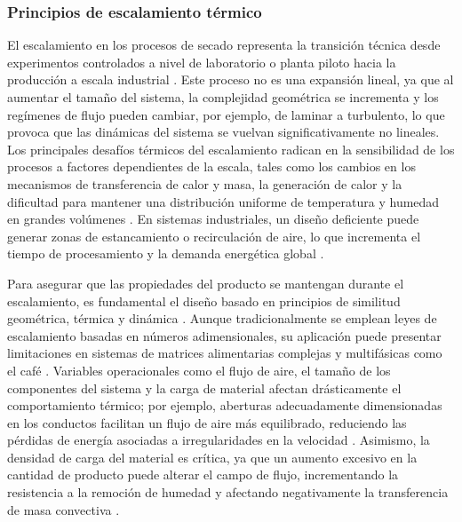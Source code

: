\subsubsection{Principios de escalamiento térmico}

El escalamiento en los procesos de secado representa la transición técnica desde experimentos controlados a nivel de laboratorio o planta piloto hacia la producción a escala industrial \parencite{szpicer_advances_2025}. Este proceso no es una expansión lineal, ya que al aumentar el tamaño del sistema, la complejidad geométrica se incrementa y los regímenes de flujo pueden cambiar, por ejemplo, de laminar a turbulento, lo que provoca que las dinámicas del sistema se vuelvan significativamente no lineales. Los principales desafíos térmicos del escalamiento radican en la sensibilidad de los procesos a factores dependientes de la escala, tales como los cambios en los mecanismos de transferencia de calor y masa, la generación de calor y la dificultad para mantener una distribución uniforme de temperatura y humedad en grandes volúmenes \parencite{szpicer_advances_2025}. En sistemas industriales, un diseño deficiente puede generar zonas de estancamiento o recirculación de aire, lo que incrementa el tiempo de procesamiento y la demanda energética global \parencite{szpicer_advances_2025, yu_current_2025}.

Para asegurar que las propiedades del producto se mantengan durante el escalamiento, es fundamental el diseño basado en principios de similitud geométrica, térmica y dinámica \parencite{szpicer_advances_2025}. Aunque tradicionalmente se emplean leyes de escalamiento basadas en números adimensionales, su aplicación puede presentar limitaciones en sistemas de matrices alimentarias complejas y multifásicas como el café \parencite{szpicer_advances_2025}. Variables operacionales como el flujo de aire, el tamaño de los componentes del sistema y la carga de material afectan drásticamente el comportamiento térmico; por ejemplo, aberturas adecuadamente dimensionadas en los conductos facilitan un flujo de aire más equilibrado, reduciendo las pérdidas de energía asociadas a irregularidades en la velocidad \parencite{du_design_2025}. Asimismo, la densidad de carga del material es crítica, ya que un aumento excesivo en la cantidad de producto puede alterar el campo de flujo, incrementando la resistencia a la remoción de humedad y afectando negativamente la transferencia de masa convectiva \parencite{onwude_scaling-up_2021, cansee_effect_2026}.

